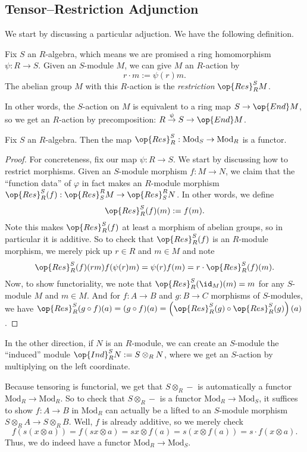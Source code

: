 \subsection{Tensor--Restriction Adjunction}
We start by discussing a particular adjuction. We have the following definition.
\begin{definition}[Restriction]
	Fix $S$ an $R$-algebra, which means we are promised a ring homomorphism $\psi:R\to S$. Given an $S$-module $M$, we can give $M$ an $R$-action by
	\[r\cdot m:=\psi(r)m.\]
	The abelian group $M$ with this $R$-action is the \textit{restriction} $\op{Res}_R^SM$.
\end{definition}
In other words, the $S$-action on $M$ is equivalent to a ring map $S\to\op{End}M$, so we get an $R$-action by precomposition: $R\stackrel\psi\to S\to\op{End}M$.
\begin{lemma}
	Fix $S$ an $R$-algebra. Then the map $\op{Res}^S_R:\textrm{Mod}_S\to\textrm{Mod}_R$ is a functor.
\end{lemma}
\begin{proof}
	For concreteness, fix our map $\psi:R\to S$. We start by discussing how to restrict morphisms. Given an $S$-module morphism $f:M\to N$, we claim that the ``function data'' of $\varphi$ in fact makes an $R$-module morphism $\op{Res}_R^S(f):\op{Res}_S^RM\to\op{Res}_S^RN$. In other words, we define
	\[\op{Res}_R^S(f)(m):=f(m).\]
	Note this makes $\op{Res}_R^S(f)$ at least a morphism of abelian groups, so in particular it is additive. So to check that $\op{Res}_R^S(f)$ is an $R$-module morphism, we merely pick up $r\in R$ and $m\in M$ and note
	\[\op{Res}_R^S(f)(rm)f(\psi(r)m)=\psi(r)f(m)=r\cdot\op{Res}_R^S(f)(m).\]
	Now, to show functoriality, we note that $\op{Res}_R^S(\id_M)(m)=m$ for any $S$-module $M$ and $m\in M$. And for $f:A\to B$ and $g:B\to C$ morphisms of $S$-modules, we have $\op{Res}_R^S(g\circ f)(a)=(g\circ f)(a)=\left(\op{Res}_R^S(g)\circ\op{Res}_R^S(g)\right)(a)$.
\end{proof}

In the other direction, if $N$ is an $R$-module, we can create an $S$-module the ``induced'' module $\op{Ind}_R^SN:=S\otimes_RN$, where we get an $S$-action by multiplying on the left coordinate.

Because tensoring is functorial, we get that $S\otimes_R-$ is automatically a functor $\textrm{Mod}_R\to\textrm{Mod}_R$. So to check that $S\otimes_R-$ is a functor $\textrm{Mod}_R\to\textrm{Mod}_S$, it suffices to show $f:A\to B$ in $\textrm{Mod}_R$ can actually be a lifted to an $S$-module morphism $S\otimes_RA\to S\otimes_RB$. Well, $f$ is already additive, so we merely check
\[f(s(x\otimes a))=f(sx\otimes a)=sx\otimes f(a)=s(x\otimes f(a))=s\cdot f(x\otimes a).\]
Thus, we do indeed have a functor $\textrm{Mod}_R\to\textrm{Mod}_S$.

